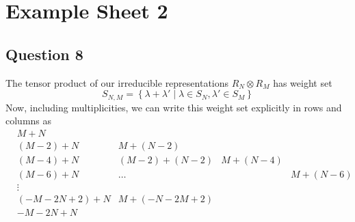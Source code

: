 \section{Example Sheet 2} 

\subsection{Question 8} 
The tensor product of our irreducible representations $ R _ N \otimes R _M$
has weight set 
\[
 S_{ N , M } = \left\{  \lambda + \lambda ' \mid \lambda \in 
 S _ N , \lambda ' \in S _ M \right\} 
\] Now, including multiplicities, we can write this weight set 
explicitly in rows and columns as 
\begin{align*}
	& M + N & & & \\
	& (M - 2 ) + N & M + ( N - 2) & & \\
	& (M - 4 ) + N & ( M - 2 ) + ( N - 2 ) & M + ( N - 4 ) & \\
	& (M - 6 ) + N & \dots & & M + ( N - 6 ) \\
	& \vdots & & & \\
	& ( -M - 2N + 2) + N   &  M + (  - N - 2M  + 2)  & & \\
	& - M - 2N  + N & & & 
\end{align*}
